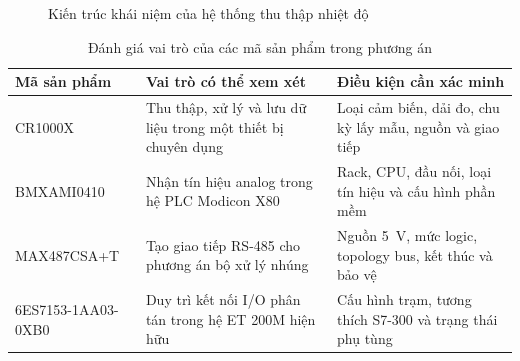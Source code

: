\begin{figure}[H]
\centering
{}
\caption{Kiến trúc khái niệm của hệ thống thu thập nhiệt độ}
\label{fig:temperature-architecture}
\end{figure}

\begin{table}[H]
\centering
\caption{Đánh giá vai trò của các mã sản phẩm trong phương án}
\label{tab:product-role-evaluation}
\small
\renewcommand{\arraystretch}{1.1}
\begin{tabularx}{\textwidth}{>{\ttfamily\raggedright\arraybackslash}p{4.1cm} >{\raggedright\arraybackslash}X >{\raggedright\arraybackslash}X}
\toprule
\normalfont\textbf{Mã sản phẩm} & \textbf{Vai trò có thể xem xét} & \textbf{Điều kiện cần xác minh} \\
\midrule
CR1000X & Thu thập, xử lý và lưu dữ liệu trong một thiết bị chuyên dụng & Loại cảm biến, dải đo, chu kỳ lấy mẫu, nguồn và giao tiếp \\
BMXAMI0410 & Nhận tín hiệu analog trong hệ PLC Modicon X80 & Rack, CPU, đầu nối, loại tín hiệu và cấu hình phần mềm \\
MAX487CSA+T & Tạo giao tiếp RS-485 cho phương án bộ xử lý nhúng & Nguồn 5~V, mức logic, topology bus, kết thúc và bảo vệ \\
6ES7153-1AA03-0XB0 & Duy trì kết nối I/O phân tán trong hệ ET 200M hiện hữu & Cấu hình trạm, tương thích S7-300 và trạng thái phụ tùng \\
\bottomrule
\end{tabularx}
\end{table}

